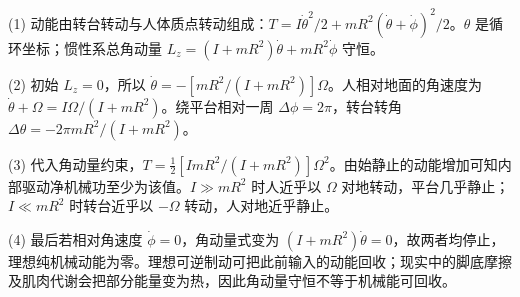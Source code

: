 (1) 动能由转台转动与人体质点转动组成：\(T=I\dot\theta^2/2+mR^2(\dot\theta+\dot\phi)^2/2\)。\(\theta\) 是循环坐标；惯性系总角动量 \(L_z=(I+mR^2)\dot\theta+mR^2\dot\phi\) 守恒。

(2) 初始 \(L_z=0\)，所以 \(\dot\theta=-[mR^2/(I+mR^2)]\Omega\)。人相对地面的角速度为 \(\dot\theta+\Omega=I\Omega/(I+mR^2)\)。绕平台相对一周 \(\Delta\phi=2\pi\)，转台转角 \(\Delta\theta=-2\pi mR^2/(I+mR^2)\)。

(3) 代入角动量约束，\(T=\frac12[I mR^2/(I+mR^2)]\Omega^2\)。由始静止的动能增加可知内部驱动净机械功至少为该值。\(I\gg mR^2\) 时人近乎以 \(\Omega\) 对地转动，平台几乎静止；\(I\ll mR^2\) 时转台近乎以 \(-\Omega\) 转动，人对地近乎静止。

(4) 最后若相对角速度 \(\dot\phi=0\)，角动量式变为 \((I+mR^2)\dot\theta=0\)，故两者均停止，理想纯机械动能为零。理想可逆制动可把此前输入的动能回收；现实中的脚底摩擦及肌肉代谢会把部分能量变为热，因此角动量守恒不等于机械能可回收。
